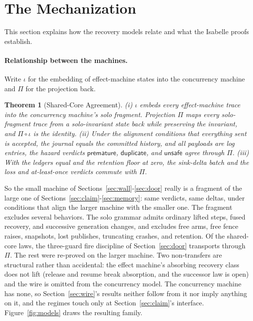 \documentclass[sigplan,10pt]{acmart}
\theoremstyle{plain}
\newtheorem{theorem}{Theorem}
\theoremstyle{definition}
\newcommand{\prem}{\mathsf{premature}}
\newcommand{\dupl}{\mathsf{duplicate}}
\newcommand{\unsafe}{\mathsf{unsafe}}
\begin{document}
\section{The Mechanization}\label{sec:mech}

This section explains how the recovery models relate and what the
Isabelle proofs establish.

\paragraph{Relationship between the machines.}
Write $\iota$ for the embedding of effect-machine states into the
concurrency machine and $\Pi$ for the projection back.

\begin{theorem}[Shared-Core Agreement]\label{thm:agree}
(i) $\iota$ embeds every effect-machine trace into the concurrency
machine's solo fragment. Projection $\Pi$ maps every solo-fragment trace
from a solo-invariant state back while preserving the invariant, and
$\Pi \circ \iota$ is the identity. (ii) Under the alignment
conditions that everything sent is accepted, the journal equals the
committed history, and all payloads are log entries, the hazard verdicts $\prem$,
$\dupl$, and $\unsafe$ agree through $\Pi$. (iii) With the ledgers equal
and the retention floor at zero, the sink-delta batch and the loss and
at-least-once verdicts commute with $\Pi$.
\end{theorem}

So the small machine of Sections~\ref{sec:wall}-\ref{sec:door}
really is a fragment of the large one of
Sections~\ref{sec:claim}-\ref{sec:memory}: same verdicts, same
deltas, under conditions that align the larger machine with the smaller
one. The fragment excludes several behaviors. The solo
grammar admits ordinary lifted steps, fused recovery, and successive
generation changes, and excludes free arms, free fence raises,
snapshots, lost publishes, truncating crashes, and retention. Of the
shared-core laws, the three-guard fire discipline of
Section~\ref{sec:door} transports through $\Pi$. The rest were
re-proved on the larger machine. Two non-transfers are structural
rather than accidental: the effect machine's absorbing recovery class
does not lift (release and resume break absorption, and the successor
law is open) and the wire is omitted from the concurrency model. The concurrency
machine has none, so Section~\ref{sec:wire}'s results neither follow
from it nor imply anything on it, and the regimes touch only at
Section~\ref{sec:claim}'s interface. Figure~\ref{fig:models} draws
the resulting family.
\end{document}
